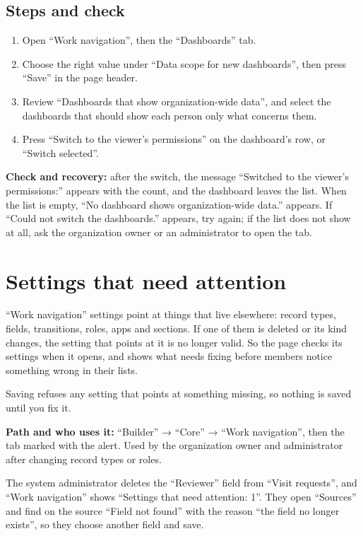 \subsection{Steps and check}
\begin{enumerate}
\item Open “Work navigation”, then the “Dashboards” tab.
\item Choose the right value under “Data scope for new dashboards”, then press “Save” in the page header.
\item Review “Dashboards that show organization-wide data”, and select the dashboards that should show each person only what concerns them.
\item Press “Switch to the viewer’s permissions” on the dashboard's row, or “Switch selected”.
\end{enumerate}

\textbf{Check and recovery:} after the switch, the message “Switched to the viewer’s permissions:” appears with the count, and the dashboard leaves the list. When the list is empty, “No dashboard shows organization-wide data.” appears. If “Could not switch the dashboards.” appears, try again; if the list does not show at all, ask the organization owner or an administrator to open the tab.

\clearpage
\section{Settings that need attention}
\label{sec:builder-feature-work-navigation-stale}

“Work navigation” settings point at things that live elsewhere: record types, fields, transitions, roles, apps and sections. If one of them is deleted or its kind changes, the setting that points at it is no longer valid. So the page checks its settings when it opens, and shows what needs fixing before members notice something wrong in their lists.

Saving refuses any setting that points at something missing, so nothing is saved until you fix it.

\textbf{Path and who uses it:} “Builder” → “Core” → “Work navigation”, then the tab marked with the alert. Used by the organization owner and administrator after changing record types or roles.

\begin{rcnote}
The system administrator deletes the “Reviewer” field from “Visit requests”, and “Work navigation” shows “Settings that need attention: 1”. They open “Sources” and find on the source “Field not found” with the reason “the field no longer exists”, so they choose another field and save.
\end{rcnote}

